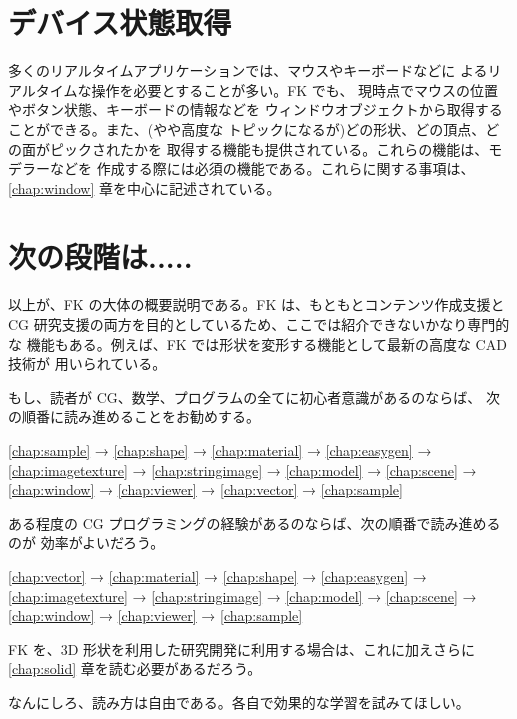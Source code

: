 
\section{デバイス状態取得}
多くのリアルタイムアプリケーションでは、マウスやキーボードなどに
よるリアルタイムな操作を必要とすることが多い。FK でも、
現時点でマウスの位置やボタン状態、キーボードの情報などを
ウィンドウオブジェクトから取得することができる。また、(やや高度な
トピックになるが)どの形状、どの頂点、どの面がピックされたかを
取得する機能も提供されている。これらの機能は、モデラーなどを
作成する際には必須の機能である。これらに関する事項は、
\ref{chap:window} 章を中心に記述されている。

\section{次の段階は.....}
以上が、FK の大体の概要説明である。FK は、もともとコンテンツ作成支援と
CG 研究支援の両方を目的としているため、ここでは紹介できないかなり専門的な
機能もある。例えば、FK では形状を変形する機能として最新の高度な CAD 技術が
用いられている。

もし、読者が CG、数学、プログラムの全てに初心者意識があるのならば、
次の順番に読み進めることをお勧めする。
\begin{center}
\ref{chap:sample} → \ref{chap:shape} → \ref{chap:material} →
\ref{chap:easygen} → \ref{chap:imagetexture} → \ref{chap:stringimage} →
\ref{chap:model} → \ref{chap:scene} → \ref{chap:window} →
\ref{chap:viewer} → \ref{chap:vector} → \ref{chap:sample} 
\end{center}
ある程度の CG プログラミングの経験があるのならば、次の順番で読み進めるのが
効率がよいだろう。
\begin{center}
\ref{chap:vector} → \ref{chap:material} → \ref{chap:shape} →
\ref{chap:easygen} → \ref{chap:imagetexture} → \ref{chap:stringimage} →
\ref{chap:model} → \ref{chap:scene} → \ref{chap:window} →
\ref{chap:viewer} → \ref{chap:sample}
\end{center}
FK を、3D 形状を利用した研究開発に利用する場合は、これに加えさらに
\ref{chap:solid} 章を読む必要があるだろう。

なんにしろ、読み方は自由である。各自で効果的な学習を試みてほしい。
